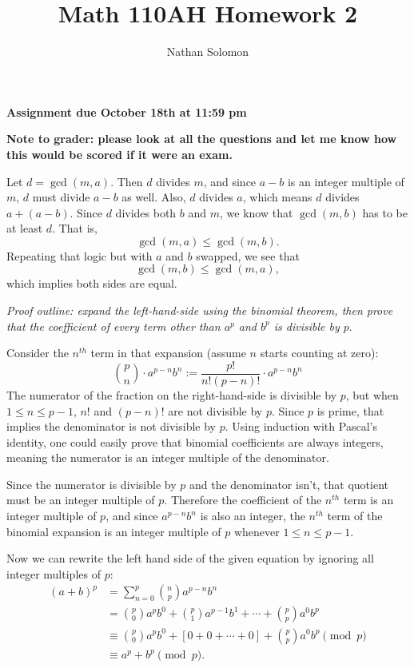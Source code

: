 \documentclass[12pt]{article}
\begin{document}
\title{Math 110AH Homework 2}
\author{Nathan Solomon}
\maketitle

\textbf{Assignment due October 18th at 11:59 pm}
\par
\textbf{Note to grader: please look at all the questions and let me know how this would be scored if it were an exam.}

\bigskip
\noindent{}\bigskip

Let $d = \operatorname{gcd}(m,a)$. Then $d$ divides $m$, and since $a-b$ is an integer multiple of $m$, $d$ must divide $a-b$ as well. Also, $d$ divides $a$, which means $d$ divides $a + (a-b)$. Since $d$ divides both $b$ and $m$, we know that $\operatorname{gcd}(m,b)$ has to be at least $d$. That is,
\[ \operatorname{gcd}(m,a) \leq \operatorname{gcd}(m,b). \]
Repeating that logic but with $a$ and $b$ swapped, we see that
\[ \operatorname{gcd}(m,b) \leq \operatorname{gcd}(m,a), \]
which implies both sides are equal.

\bigskip
\noindent{}\bigskip

\textit{Proof outline: expand the left-hand-side using the binomial theorem, then prove that the coefficient of every term other than $a^p$ and $b^p$ is divisible by $p$}.
\par
Consider the $n^{th}$ term in that expansion (assume $n$ starts counting at zero):
\[ \binom{p}{n} \cdot a^{p-n} b^n := \frac{p!}{n!(p-n)!} \cdot a^{p-n} b^n \]
The numerator of the fraction on the right-hand-side is divisible by $p$, but when $1 \leq n \leq p-1$, $n!$ and $(p-n)!$ are not divisible by $p$. Since $p$ is prime, that implies the denominator is not divisible by $p$. Using induction with Pascal's identity, one could easily prove that binomial coefficients are always integers, meaning the numerator is an integer multiple of the denominator.
\par
Since the numerator is divisible by $p$ and the denominator isn't, that quotient must be an integer multiple of $p$. Therefore the coefficient of the $n^{th}$ term is an integer multiple of $p$, and since $a^{p-n}b^n$ is also an integer, the $n^{th}$ term of the binomial expansion is an integer multiple of $p$ whenever $1 \leq n \leq p-1$.
\par
Now we can rewrite the left hand side of the given equation by ignoring all integer multiples of $p$:
\begin{align*}
    (a+b)^p &= \sum_{n=0}^p \binom{n}{p} a^{p-n} b^{n} \\
            &= \binom{p}{0} a^p b^0 + \binom{p}{1} a^{p-1} b^1 + \cdots + \binom{p}{p} a^0 b^p \\
            &\equiv \binom{p}{0} a^p b^0 + [0 + 0 + \cdots + 0] + \binom{p}{p} a^0 b^p \pmod{p} \\
            &\equiv a^p + b^p \pmod{p}.
\end{align*}
\end{document}

